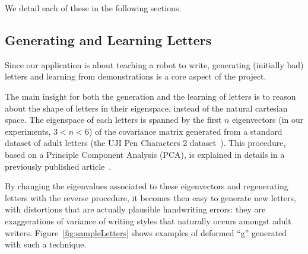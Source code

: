 \documentclass{article}
\begin{document}
We detail each of these in the following sections.

\subsection{Generating and Learning Letters}

Since our application is about teaching a robot to write, generating (initially
bad) letters and learning from demonstrations is a core aspect of the project.

The main insight for both the generation and the learning of letters is to
reason about the shape of letters in their eigenspace, instead of the natural
cartesian space. The eigenspace of each letters is spanned by the first $n$
eigenvectors (in our experiments, $3 < n < 6$) of the covariance matrix
generated from a standard dataset of adult letters (the UJI Pen Characters 2
dataset~\cite{Llorens2008}).  This procedure, based on a Principle Component
Analysis (PCA), is explained in details in a previously published
article~\cite{hood2015when}.

By changing the eigenvalues associated to these eigenvectors and regenerating
letters with the reverse procedure, it becomes then easy to generate new
letters, with distortions that are actually plausible handwriting errors: they
are exaggerations of variance of writing styles that naturally occurs amongst
adult writers.  Figure~\ref{fig:sampleLetters} shows examples of deformed ``g''
generated with such a technique.
\end{document}

